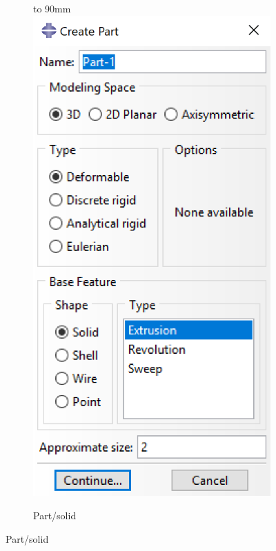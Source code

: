 \documentclass[spanish,a4paper,12pt]{article}
\def\imagebox#1#2{\vtop to #1{\null\hbox{#2}\vfill}}
\begin{document}
\begin{figure}[h!tp]
\centering
\captionsetup[subfigure]{justification=centering,singlelinecheck=false}
  \begin{subfigure}[b]{0.38\textwidth}
  \hspace{10mm}
    \imagebox{90mm}{\includegraphics[scale=0.51]{capturas/solid.png}}
    \caption{Part/solid\label{fig:bar1a}}

\end{subfigure}
\end{figure}
\end{document}
